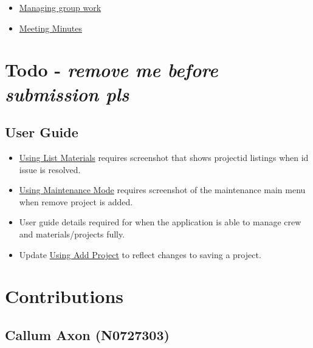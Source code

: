 \documentclass[
  english,
  a4paper,
,tablecaptionabove
]{scrartcl}
\providecommand{\tightlist}{%
  \setlength{\itemsep}{0pt}\setlength{\parskip}{0pt}}
\begin{document}
\begin{itemize}
  \begin{itemize}
  \tightlist
  \item
    \protect\hyperlink{managing-group-work}{Managing group work}
  \item
    \protect\hyperlink{meeting-minutes}{Meeting Minutes}
  \end{itemize}
\end{itemize}

\newpage

\hypertarget{todo---remove-me-before-submission-pls}{%
\section{\texorpdfstring{Todo - \textbf{\emph{remove me before
submission
pls}}}{Todo - remove me before submission pls}}\label{todo---remove-me-before-submission-pls}}

\hypertarget{user-guide}{%
\subsection{User Guide}\label{user-guide}}

\begin{itemize}
\tightlist
\item
  \protect\hyperlink{using-list-materials}{Using List Materials}
  requires screenshot that shows projectid listings when id issue is
  resolved.
\item
  \protect\hyperlink{using-maintenance-mode}{Using Maintenance Mode}
  requires screenshot of the maintenance main menu when remove project
  is added.
\item
  User guide details required for when the application is able to manage
  crew and materials/projects fully.
\item
  Update \protect\hyperlink{using-add-project}{Using Add Project} to
  reflect changes to saving a project.
\end{itemize}

\newpage

\hypertarget{contributions}{%
\section{Contributions}\label{contributions}}

\hypertarget{callum-axon-n0727303}{%
\subsection{Callum Axon (N0727303)}\label{callum-axon-n0727303}}
\end{document}

